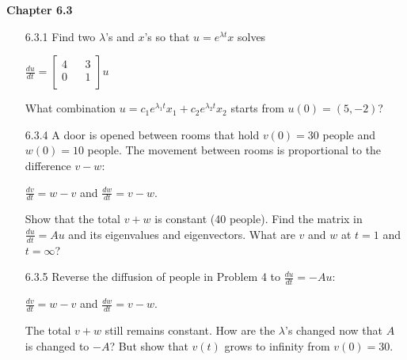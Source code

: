\documentclass[10pt,twoside,reqno]{article}
\begin{document}
\vspace{5mm}
\textbf{Chapter 6.3}
\begin{enumerate}
\item[6.3.1] Find two $\lambda$'s and $x$'s so that $u = e^{\lambda t}x$ solves\\
\begin{center}
$
$$
\frac{du}{dt} =
\begin{bmatrix}
4 && 3\\
0 && 1\\
\end{bmatrix}
u
$$
$\\
\end{center}
What combination $u = c_1e^{\lambda_1t}x_1 + c_2e^{\lambda_2t}x_2$ starts from $u(0) = (5, -2)$?\\


\vspace{3mm}
\item[6.3.4] A door is opened between rooms that hold $v(0) = 30$ people and $w(0) = 10$ people. The movement between rooms is proportional to the difference $v - w$:\\
\begin{center}
$\frac{dv}{dt} = w - v$ \hspace{3mm} and \hspace{3mm} $\frac{dw}{dt} = v - w$.\\
\end{center}
Show that the total $v + w$ is constant (40 people). Find the matrix in $\frac{du}{dt} = Au$ and its eigenvalues and eigenvectors. What are $v$ and $w$ at $t = 1$ and $t = \infty$?\\


\vspace{3mm}
\item[6.3.5] Reverse the diffusion of people in Problem 4 to $\frac{du}{dt} = -Au$:\\
\begin{center}
$\frac{dv}{dt} = w - v$ \hspace{3mm} and \hspace{3mm} $\frac{dw}{dt} = v - w$.\\
\end{center}
The total $v + w$ still remains constant. How are the $\lambda$'s changed now that $A$ is changed to $-A$? But show that $v(t)$ grows to infinity from $v(0) = 30$.\\



\end{enumerate}
\end{document}
